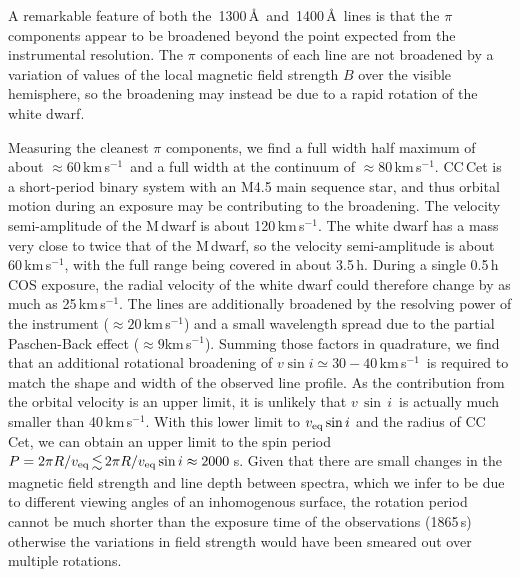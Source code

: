 \documentclass[fleqn,usenatbib]{mnras}
\newcommand{\vsini}{\ensuremath{v\,\sin\,i}}
\newcommand{\kms}{km\,s$^{-1}$}
\begin{document}
A remarkable feature of both the \,1300\,\AA\ and \,1400\,\AA\ lines is that the $\pi$ components appear to be broadened beyond the point expected from the instrumental resolution. The $\pi$ components of each line are not broadened by a variation of values of the local magnetic field strength $B$ over the visible hemisphere, so the broadening may instead be due to a rapid rotation of the white dwarf. 

Measuring the cleanest $\pi$ components, we find a full width half maximum of about $\approx60$\,\kms\, and a full width at the continuum of $\approx80$\,\kms. CC\,Cet is a short-period binary system with an M4.5 main sequence star, and thus orbital motion during an exposure may be contributing to the broadening. The velocity semi-amplitude of the M\,dwarf is about 120\,\kms \citep{safferetal93-1}. The white dwarf has a mass very close to twice that of the M\,dwarf, so the velocity semi-amplitude is about 60\,\kms, with the full range being covered in about 3.5\,h. During a single 0.5\,h COS exposure, the radial velocity of the white dwarf could therefore change by as much as 25\,\kms. The lines are additionally broadened by the resolving power of the instrument ($\approx20$\,\kms) and a small wavelength spread due to the partial Paschen-Back effect ($\approx9$\kms). Summing those factors in quadrature, we find that an additional rotational broadening of $v\sin i\simeq30-40$\,\kms\ is required to match the shape and width of the observed line profile. As the contribution from the orbital velocity is an upper limit, it is unlikely that \vsini\ is actually much smaller than 40\,\kms. With this lower limit to $v_{\rm eq} \sin i$ and the radius of CC\,Cet, we can obtain an upper limit to the spin period $P = 2 \pi R/v_{\rm eq} \la 2 \pi R/v_{\rm eq} \sin i \approx 2000$\,s. Given that there are small changes in the magnetic field strength and line depth between spectra, which we infer to be due to different viewing angles of an inhomogenous surface, the rotation period cannot be much shorter than the exposure time of the observations (1865\,s) otherwise the variations in field strength would have been smeared out over multiple rotations. 
\end{document}
